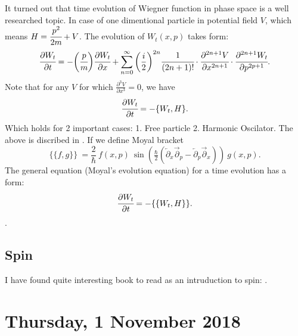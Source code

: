 \documentclass[main.tex]{subfiles}
\begin{document}
It turned out that time evolution of Wiegner function in phase space is a well researched topic. In case of one dimentional particle in potential field $V$, which means $H = \cfrac{p^2}{2m} + V$. The evolution of $ W_t(x,p)$ takes form:
\begin{equation}
\cfrac{\partial W_t}{\partial t} = -\bigg(\cfrac{p}{m}\bigg)\cfrac{\partial W_t}{\partial x} + \sum_{n=0}^\infty \bigg(\frac{i}{2}\bigg)^{2n} \cfrac{1}{(2n+1)!} \cdot\cfrac{\partial^{2n + 1} V}{\partial x^{2n + 1}}\cdot\cfrac{\partial^{2n + 1} W_t}{\partial p^{2p + 1}}.
\end{equation}
Note that for any $V$ for which $\frac{\partial^3 V}{\partial x^3} = 0$, we have
\begin{equation}
\cfrac{\partial W_t}{\partial t} = - \{W_t, H\}.
\end{equation}
Which holds for 2 important cases: 1. Free particle 2. Harmonic Oscilator.
The above is discribed in \cite[see][3.2
Time Dependence of the Wigner Function]{kim-noz1991}.
If we define Moyal bracket
\begin{equation}
\{\{f,g\}\}\ =
\frac{2}{\hbar} ~ f(x,p)\  \sin \left ( {{\tfrac{\hbar }{2}}(\overleftarrow{\partial }_x
\overrightarrow{\partial }_{p}-\overleftarrow{\partial }_{p}\overrightarrow{\partial }_{x})} \right ) 
\  g(x,p).
\end{equation}
The general equation (Moyal's evolution equation) for a time evolution has a form:
\begin{equation}
\cfrac{\partial W_t}{\partial t} = - \{\{W_t, H\}\}.
\end{equation}
\cite[see]{moyal1949}.
\subsection{Spin}
I have found quite interesting book to read as an intruduction to spin: \cite{vonsovsky1975}.
\section{Thursday, 1 November 2018}
\end{document}
